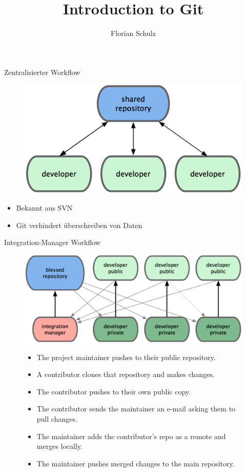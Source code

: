 \documentclass{beamer}
\title[Git]{Introduction to Git}
\author{Florian Schulz}
\begin{document}
\begin{frame}
\titlepage
\end{frame}

\begin{frame}{Zentralisierter Workflow}
\begin{figure} 
\centering
\includegraphics{images/centralized-workflow.png}
\end{figure}
\begin{itemize}
\pause \item Bekannt aus SVN
\pause \item Git verhindert überschreiben von Daten
\end{itemize}
\end{frame}

\begin{frame}{Integration-Manager Workflow}
\begin{figure} 
\centering
\includegraphics{images/integration-manager-workflow.png}
\begin{itemize}
\pause \item The project maintainer pushes to their public repository.
\pause \item A contributor clones that repository and makes changes.
\pause \item The contributor pushes to their own public copy.
\pause \item The contributor sends the maintainer an e-mail asking them to pull changes.
\pause \item The maintainer adds the contributor’s repo as a remote and merges locally.
\pause \item The maintainer pushes merged changes to the main repository.
\end{itemize}
\end{figure}
\end{frame}
\end{document}
